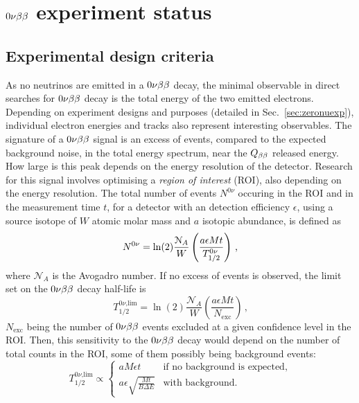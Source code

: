 \section{$0\nu\beta\beta$ experiment status}
\subsection{Experimental design criteria}

As no neutrinos are emitted in a $0\nu\beta\beta$ decay, the minimal observable in direct searches for $0\nu\beta\beta$ decay is the total energy of the two emitted electrons.
Depending on experiment designs and purposes (detailed in Sec.~\ref{sec:zeronuexp}), individual electron energies and tracks also represent interesting observables.
The signature of a $0\nu\beta\beta$ signal is an excess of events, compared to the expected background noise, in the total energy spectrum, near the $Q_{\beta\beta}$ released energy.
How large is this peak depends on the energy resolution of the detector.
Research for this signal involves optimising a \emph{region of interest} (ROI), also depending on the energy resolution.
The total number of events $N^{0\nu}$ occuring in the ROI and in the measurement time $t$, for a detector with an detection efficiency $\epsilon$, using a source isotope of $W$ atomic molar mass and $a$ isotopic abundance, is defined as
\begin{equation}
  N^{0\nu}=\ln(2)\frac{\mathcal{N}_{A}}{W}\left(\frac{a\epsilon M t}{T_{1/2}^{0\nu}}\right)\,\text{,}
  \label{eq:Nevents}
\end{equation}
where $\mathcal{N}_{A}$ is the Avogadro number.
If no excess of events is observed, the limit set on the $0\nu\beta\beta$ decay half-life is
\begin{equation}
  T_{1/2}^{0\nu\text{,lim}}=\ln(2)\frac{\mathcal{N}_{A}}{W}\left(\frac{a\epsilon M t}{N_{\text{exc}}}\right)\,\text{,}
  \label{eq:Tlim}
\end{equation}
$N_{\text{exc}}$ being the number of $0\nu\beta\beta$ events excluded at a given confidence level in the ROI.
Then, this sensitivity to the $0\nu\beta\beta$ decay would depend on the number of total counts in the ROI, some of them possibly being background events:
\begin{equation}
  T_{1/2}^{0\nu\text{,lim}} \propto \left\{
  \begin{array}{ll}
    a M \epsilon t & \text{if no background is expected,} \\
    a \epsilon \sqrt{\frac{M t}{B \Delta E}} & \text{with background.}
  \end{array}
  \right.
  \label{eq:sensitivity_background}
\end{equation}
